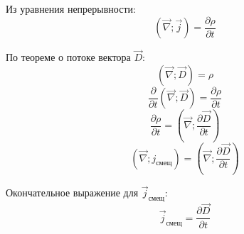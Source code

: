 \documentclass{article}
\begin{document}
	Из уравнения непрерывности:
	\begin{equation}
		(\vec\nabla;\vec j) = \frac{\partial\rho}{\partial t}
	\end{equation}

	По теореме о потоке вектора $\vec D$:
	\begin{equation}
		(\vec\nabla;\vec D) = \rho
	\end{equation}
	\begin{equation}
		\frac{\partial}{\partial t}(\vec\nabla;\vec D) = \frac{\partial\rho}{\partial t}
	\end{equation}
	\begin{equation}
		\frac{\partial\rho}{\partial t} = (\vec\nabla;\frac{\partial\vec D}{\partial t})
	\end{equation}
	\begin{equation}
		(\vec\nabla;j_\text{смещ}) = (\vec\nabla;\frac{\partial\vec D}{\partial t})
	\end{equation}

	Окончательное выражение для $\vec j_\text{смещ}$:
	\begin{equation}
		\vec j_\text{смещ} = \frac{\partial \vec D}{\partial t}
	\end{equation}
\end{document}

